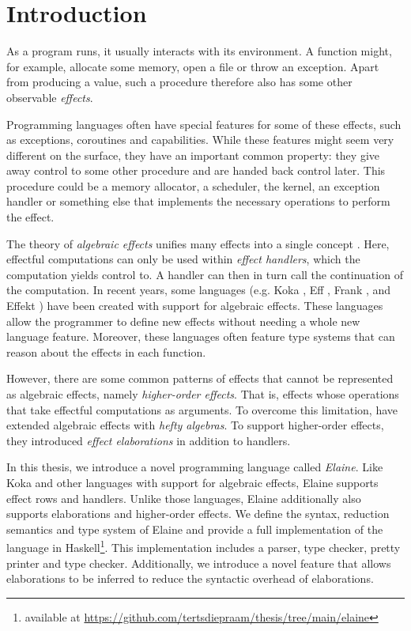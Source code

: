 \chapter{Introduction}\label{chap:introduction}

As a program runs, it usually interacts with its environment. A function might, for example, allocate some memory, open a file or throw an exception. Apart from producing a value, such a procedure therefore also has some other observable \emph{effects}.

Programming languages often have special features for some of these effects, such as exceptions, coroutines and capabilities. While these features might seem very different on the surface, they have an important common property: they give away control to some other procedure and are handed back control later. This procedure could be a memory allocator, a scheduler, the kernel, an exception handler or something else that implements the necessary operations to perform the effect.

The theory of \emph{algebraic effects} unifies many effects into a single concept \autocite{goos_adequacy_2001, castagna_handlers_2009}. Here, effectful computations can only be used within \emph{effect handlers}, which the computation yields control to. A handler can then in turn call the continuation of the computation. In recent years, some languages (e.g. Koka \autocite{leijen_koka_2014}, Eff \autocite{bauer_programming_2015}, Frank \autocite{lindley_be_2017}, and Effekt \autocite{brachthauser_effects_2020}) have been created with support for algebraic effects. These languages allow the programmer to define new effects without needing a whole new language feature. Moreover, these languages often feature type systems that can reason about the effects in each function.

However, there are some common patterns of effects that cannot be represented as algebraic effects, namely \emph{higher-order effects}. That is, effects whose operations that take effectful computations as arguments. To overcome this limitation, \textcite{bach_poulsen_hefty_2023} have extended algebraic effects with \emph{hefty algebras}. To support higher-order effects, they introduced \emph{effect elaborations} in addition to handlers.

In this thesis, we introduce a novel programming language called \emph{Elaine}. Like Koka and other languages with support for algebraic effects, Elaine supports effect rows and handlers. Unlike those languages, Elaine additionally also supports elaborations and higher-order effects. We define the syntax, reduction semantics and type system of Elaine and provide a full implementation of the language in Haskell\footnote{available at \url{https://github.com/tertsdiepraam/thesis/tree/main/elaine}}. This implementation includes a parser, type checker, pretty printer and type checker. Additionally, we introduce a novel feature that allows elaborations to be inferred to reduce the syntactic overhead of elaborations.

